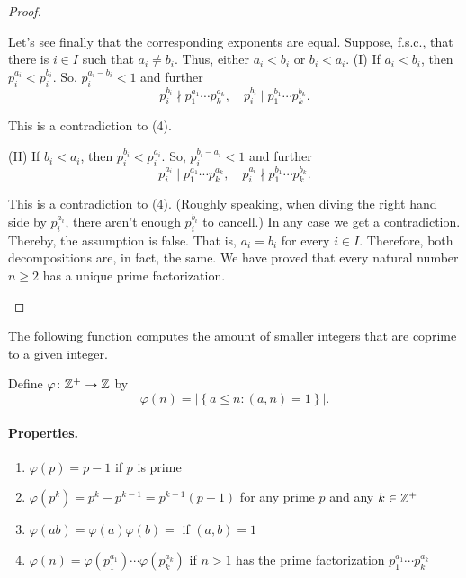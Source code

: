 \documentclass[11pt,a4paper]{article}
\begin{document}
\begin{proof}
\begin{enumerate}[left=2cm]
Let's see finally that the corresponding exponents are equal. Suppose, f.s.c., that there is $i \in I$ such that $a_i \neq b_i$. Thus, either $a_i<b_i$ or $b_i<a_i$.
(I) If $a_i<b_i$, then $p_i^{a_i}<p_i^{b_i}$. So, $p_i^{a_i-b_i}<1$ and further
\[
p_i^{b_i} \nmid p_1^{a_1} \cdots p_k^{a_k}, \quad p_i^{b_i} \mid p_1^{b_1} \cdots p_k^{b_k} .
\]

This is a contradiction to (4).

(II) If $b_i<a_i$, then $p_i^{b_i}<p_i^{a_i}$. So, $p_i^{b_i-a_i}<1$ and further
\[
p_i^{a_i} \mid p_1^{a_1} \cdots p_k^{a_k}, \quad p_i^{a_i} \nmid p_1^{b_1} \cdots p_k^{b_k} .
\]

This is a contradiction to (4). (Roughly speaking, when diving the right hand side by $p_i^{a_i}$, there aren't enough $p_i^{b_i}$ to cancell.)
In any case we get a contradiction. Thereby, the assumption is false. That is, $a_i=b_i$ for every $i \in I$. Therefore, both decompositions are, in fact, the same. We have proved that every natural number $n \geq 2$ has a unique prime factorization.
\end{enumerate}
\end{proof}

The following function  computes the amount of smaller integers that are coprime to a given integer.
\begin{defi}
    Define \(\varphi \colon \mathbb{Z}^+\to \mathbb{Z}\) by 
    \[\varphi(n) = |\left\{ a\leq n : (a,n) = 1 \right\}|.\]
\end{defi}

\paragraph{Properties.} 

\begin{enumerate}[label=(\roman*)]
    \item \(\varphi(p) = p-1\) if \(p\) is prime 
    \item \(\varphi(p^k) = p^k - p^{k-1} = p^{k-1}(p-1)\) for any prime \(p\) and any \(k\in \mathbb{Z}^+\)
    \item \(\varphi(ab) = \varphi(a)\varphi(b) = \) if \((a,b) = 1\)
    \item \(\varphi(n) = \varphi(p_1^{a_1})\cdots\varphi(p_k^{a_k})\) if \(n > 1\) has the prime factorization \(p_1^{a_1}\cdots p_k^{a_k}\)
\end{enumerate}
\end{document}

